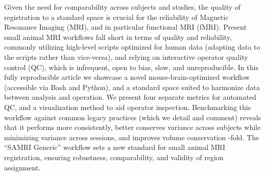 Given the need for comparability across subjects and studies, the quality of registration to a standard space is crucial for the reliability of Magnetic Resonance Imaging (MRI), and in particular functional MRI (fMRI).
Present small animal MRI workflows fall short in terms of quality and reliability, commonly utilizing high-level scripts optimized for human data (adapting data to the scripts rather than vice-versa), and relying on interactive operator quality control (QC), which is infrequent, open to bias, slow, and unreproducible.
In this fully reproducible article we showcase a novel mouse-brain-optimized workflow (accessible via Bash and Python), and a standard space suited to harmonize data between analysis and operation.
We present four separate metrics for automated QC, and a visualization method to aid operator inspection.
Benchmarking this workflow against common legacy practices (which we detail and comment) reveals that it performs more consistently, better conserves variance across subjects while minimizing variance across sessions, and improves volume conservation
-fold.
The “SAMRI Generic” workflow sets a new standard for small animal MRI registration, ensuring robustness, comparability, and validity of region assignment.
